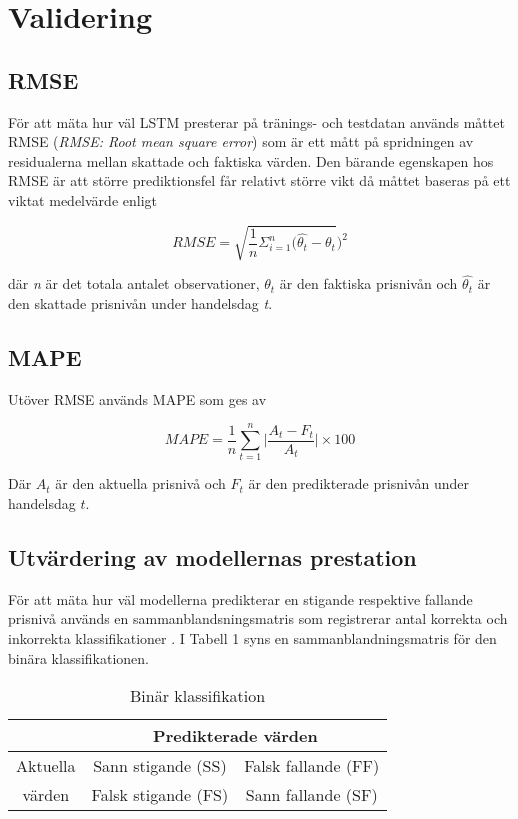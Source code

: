 \documentclass[12pt]{article}
\begin{document}
\newpage
\section{Validering}
\subsection{RMSE}

För att mäta hur väl LSTM presterar på tränings- och testdatan används måttet RMSE (\emph{RMSE: Root mean square error}) som är ett mått på spridningen av residualerna mellan skattade och faktiska värden. Den bärande egenskapen hos RMSE är att större prediktionsfel får relativt större vikt då måttet baseras på ett viktat medelvärde enligt

\begin{equation*}
RMSE = \sqrt{\frac{1}{n}\Sigma_{i=1}^{n}   (\hat{\theta_{t}} - \theta_{t}})^2
\end{equation*}

där \emph{n} är det totala antalet observationer, $\theta_{t}$ är den faktiska prisnivån och $\hat{\theta_{t}}$ är den skattade prisnivån under handelsdag \emph{t}. 

\subsection{MAPE}
    
Utöver RMSE används MAPE som ges av

\begin{equation*}
    \textit{MAPE}=\frac{1}{n} 
    \sum_{t=1}^{n} \vert \frac{A_{t}-F_{t}}{A_{t}} \vert \times 100
\end{equation*}

Där $A_{t}$ är den aktuella prisnivå och $F_{t}$ är den predikterade prisnivån under handelsdag $t$. 

\subsection{Utvärdering av modellernas prestation}

För att mäta hur väl modellerna predikterar en stigande respektive fallande prisnivå används en sammanblandsningsmatris som registrerar antal korrekta och inkorrekta klassifikationer \parencite{ModelValidation}. I Tabell 1 syns en sammanblandningsmatris för den binära klassifikationen. 

\begin{table}[H]
\caption{Binär klassifikation}
\begin{tabular}{@{}ccc@{}}
\toprule
         & \multicolumn{2}{c}{Predikterade värden}  \\ \midrule
Aktuella & Sann stigande (SS)  & Falsk fallande (FF) \\
värden   & Falsk stigande (FS) & Sann fallande (SF)  \\ \bottomrule
\end{tabular}
\end{table}
\end{document}
